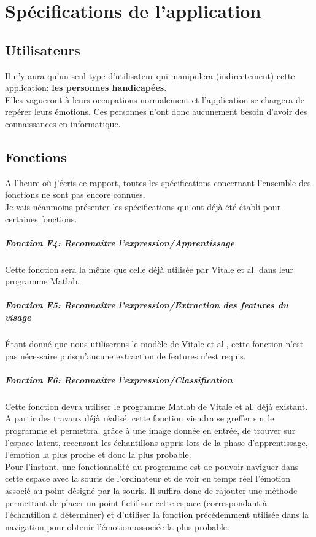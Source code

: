\documentclass[overfullbox, poster]{polytech/polytech}
\begin{document}
\newpage
\chapter{Spécifications de l'application}
\label{chap:chap_specif}

\section{Utilisateurs}
Il n'y aura qu'un seul type d'utilisateur qui manipulera (indirectement) cette application: \textbf{les personnes handicapées}.\\
Elles vagueront à leurs occupations normalement et l'application se chargera de repérer leurs émotions. Ces personnes n'ont donc aucunement besoin d'avoir des connaissances en informatique.

\section{Fonctions}
A l'heure où j'écris ce rapport, toutes les spécifications concernant l'ensemble des fonctions ne sont pas encore connues.\\
Je vais néanmoins présenter les spécifications qui ont déjà été établi pour certaines fonctions.


\paragraph{Fonction F4: Reconnaître l'expression/Apprentissage}
Cette fonction sera la même que celle déjà utilisée par Vitale et al. dans leur programme Matlab.

\paragraph{Fonction F5: Reconnaître l'expression/Extraction des \textit{features} du visage}
Étant donné que nous utiliserons le modèle de Vitale et al., cette fonction n'est pas nécessaire puisqu'aucune extraction de features n'est requis.

\paragraph{Fonction F6: Reconnaître l'expression/Classification}
Cette fonction devra utiliser le programme Matlab de Vitale et al. déjà existant. A partir des travaux déjà réalisé, cette fonction viendra se greffer sur le programme et permettra, grâce à une image donnée en entrée, de trouver sur l'espace latent, recensant les échantillons appris lors de la phase d'apprentissage, l'émotion la plus proche et donc la plus probable.\\
Pour l'instant, une fonctionnalité du programme est de pouvoir naviguer dans cette espace avec la souris de l'ordinateur et de voir en temps réel l'émotion associé au point désigné par la souris. Il suffira donc de rajouter une méthode permettant de placer un point fictif sur cette espace (correspondant à l'échantillon à déterminer) et d'utiliser la fonction précédemment utilisée dans la navigation pour obtenir l'émotion associée la plus probable.
\end{document}

